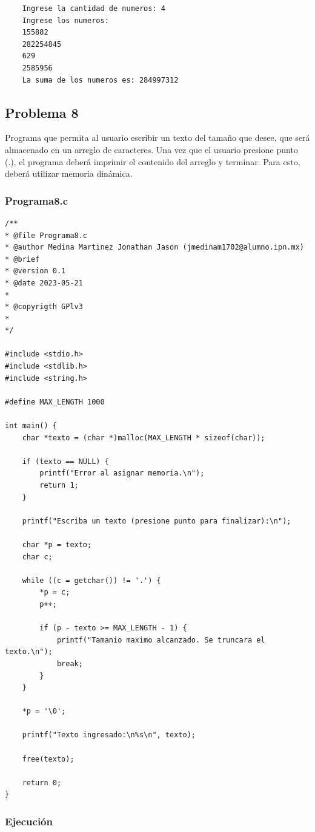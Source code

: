 \documentclass{article}
\begin{document}
	\begin{lstlisting}
	Ingrese la cantidad de numeros: 4
	Ingrese los numeros:
	155882
	282254845
	629
	2585956
	La suma de los numeros es: 284997312
	\end{lstlisting}
	
	\subsection{Problema 8}
	
	Programa que permita al usuario escribir un texto del tamaño que desee, que será almacenado en un arreglo de caracteres. Una vez que el usuario presione punto (.), el programa deberá imprimir el contenido del arreglo y terminar. Para esto, deberá utilizar memoria dinámica.
	
	\subsubsection{Programa8.c}
	
	\begin{lstlisting}
/**
* @file Programa8.c
* @author Medina Martinez Jonathan Jason (jmedinam1702@alumno.ipn.mx)
* @brief 
* @version 0.1
* @date 2023-05-21
* 
* @copyrigth GPlv3
* 
*/

#include <stdio.h>
#include <stdlib.h>
#include <string.h>

#define MAX_LENGTH 1000

int main() {
	char *texto = (char *)malloc(MAX_LENGTH * sizeof(char));
	
	if (texto == NULL) {
		printf("Error al asignar memoria.\n");
		return 1;
	}
	
	printf("Escriba un texto (presione punto para finalizar):\n");
	
	char *p = texto;
	char c;
	
	while ((c = getchar()) != '.') {
		*p = c;
		p++;
		
		if (p - texto >= MAX_LENGTH - 1) {
			printf("Tamanio maximo alcanzado. Se truncara el texto.\n");
			break;
		}
	}
	
	*p = '\0';
	
	printf("Texto ingresado:\n%s\n", texto);
	
	free(texto);
	
	return 0;
}
	\end{lstlisting}
	
	\subsubsection{Ejecución}
	
\end{document}

